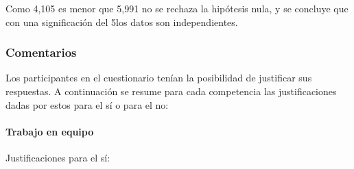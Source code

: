 \begin{center}
\end{center}

Como 4,105 es menor que 5,991 no se rechaza la hipótesis nula, y se concluye que con una significación del 5\percentage{ }los datos son independientes.

\begin{center}
\end{center}
 
\subsubsection{Comentarios} \label{ape:cuestionario:comentarios}

Los participantes en el cuestionario tenían la posibilidad de justificar sus respuestas. A continuación se resume para cada competencia las justificaciones dadas por estos para el sí o para el no:

\paragraph*{Trabajo en equipo}

Justificaciones para el sí:

